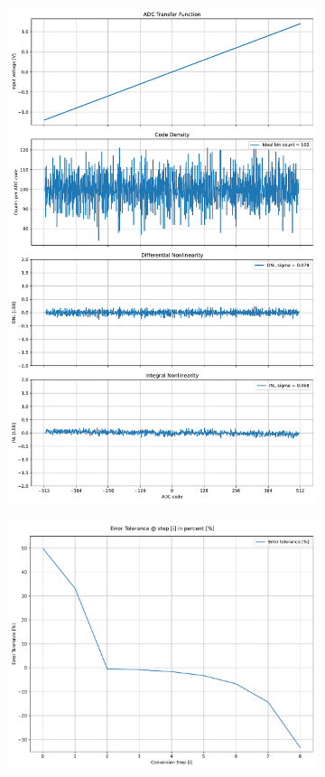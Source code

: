 \documentclass[varwidth]{standalone}
\begin{document}
\begin{figure}
\begin{subfigure}{0.32\textwidth}
    \includegraphics[width=\textwidth]{behavioral_10b_seterror_splitmsb_nonlinearity.pdf}
\end{subfigure}
\begin{subfigure}{0.32\textwidth}
    \includegraphics[width=\textwidth]{behavioral_10b_seterror_splitmsb_redundancy.pdf}

\end{subfigure}
\end{figure}
\end{document}
